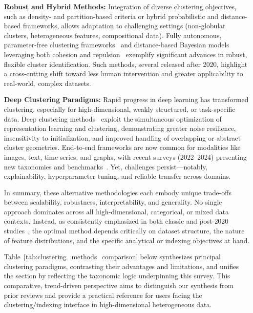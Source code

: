 \documentclass[sigconf]{acmart}
\begin{document}
\textbf{Robust and Hybrid Methods:} Integration of diverse clustering objectives, such as density- and partition-based criteria or hybrid probabilistic and distance-based frameworks, allows adaptation to challenging settings (non-globular clusters, heterogeneous features, compositional data). Fully autonomous, parameter-free clustering frameworks~\cite{ref62} and distance-based Bayesian models leveraging both cohesion and repulsion~\cite{ref57} exemplify significant advances in robust, flexible cluster identification. Such methods, several released after 2020, highlight a cross-cutting shift toward less human intervention and greater applicability to real-world, complex datasets.

\textbf{Deep Clustering Paradigms:} Rapid progress in deep learning has transformed clustering, especially for high-dimensional, weakly structured, or task-specific data. Deep clustering methods~\cite{ref22,ref67} exploit the simultaneous optimization of representation learning and clustering, demonstrating greater noise resilience, insensitivity to initialization, and improved handling of overlapping or abstract cluster geometries. End-to-end frameworks are now common for modalities like images, text, time series, and graphs, with recent surveys (2022--2024) presenting new taxonomies and benchmarks~\cite{ref22,ref67}. Yet, challenges persist---notably, explainability, hyperparameter tuning, and reliable transfer across domains.

In summary, these alternative methodologies each embody unique trade-offs between scalability, robustness, interpretability, and generality. No single approach dominates across all high-dimensional, categorical, or mixed data contexts. Instead, as consistently emphasized in both classic and post-2020 studies~\cite{ref16,ref22,ref90,ref97,ref100,ref116,ref117}, the optimal method depends critically on dataset structure, the nature of feature distributions, and the specific analytical or indexing objectives at hand.

Table~\ref{tab:clustering_methods_comparison} below synthesizes principal clustering paradigms, contrasting their advantages and limitations, and unifies the section by reflecting the taxonomic logic underpinning this survey. This comparative, trend-driven perspective aims to distinguish our synthesis from prior reviews and provide a practical reference for users facing the clustering/indexing interface in high-dimensional heterogeneous data.
\end{document}
